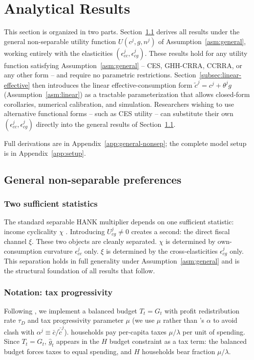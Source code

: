 \section{Analytical Results}\label{sec:analytical}

This section is organized in two parts.
Section~\ref{subsec:general-nonsep} derives all results under the general
non-separable utility function $U(c^{j},g,n^{j})$ of
Assumption~\ref{asm:general}, working entirely with the elasticities
$(\epsilon^{j}_{cc},\epsilon^{j}_{cg})$. These results hold for any utility
function satisfying Assumption~\ref{asm:general} -- CES, GHH-CRRA, CCRRA, or
any other form -- and require no parametric restrictions.
Section~\ref{subsec:linear-effective} then introduces the linear
effective-consumption form $\tilde c^{j}=c^{j}+\theta^{j}g$
(Assumption~\ref{asm:linear}) as a tractable parameterization that allows
closed-form corollaries, numerical calibration, and simulation. Researchers
wishing to use alternative functional forms -- such as CES utility -- can
substitute their own $(\epsilon^{j}_{cc},\epsilon^{j}_{cg})$ directly into the
general results of Section~\ref{subsec:general-nonsep}.

Full derivations are in Appendix~\ref{app:general-nonsep}; the complete model
setup is in Appendix~\ref{app:setup}.

\subsection{General non-separable preferences}\label{subsec:general-nonsep}

\subsubsection{Two sufficient statistics}
The standard separable HANK multiplier depends on one sufficient statistic:
income cyclicality $\chi$ \citep{Bilbiie2025}. Introducing $U_{cg}^{j}\neq 0$
creates a second: the direct fiscal channel $\xi$. These two objects are
cleanly separated. $\chi$ is determined by own-consumption curvature
$\epsilon^{j}_{cc}$ only. $\xi$ is determined by the cross-elasticities
$\epsilon^{j}_{cg}$ only. This separation holds in full generality under
Assumption~\ref{asm:general} and is the structural foundation of all results
that follow.

\subsubsection{Notation: tax progressivity}
Following \citet{Bilbiie2025}, we implement a balanced budget $T_{t}=G_{t}$ with
profit redistribution rate $\tau_{D}$ and tax progressivity parameter $\mu$ (we
use $\mu$ rather than \bilbiie{}'s $\alpha$ to avoid clash with
$\alpha^{j}\equiv\bar c/\bar{\tilde c}^{j}$). \HtM{} households pay per-capita
taxes $\mu/\lambda$ per unit of spending. Since $T_{t}=G_{t}$, $\hat g_{t}$
appears in the $H$ budget constraint as a tax term: the balanced budget forces
taxes to equal spending, and $H$ households bear fraction $\mu/\lambda$.

